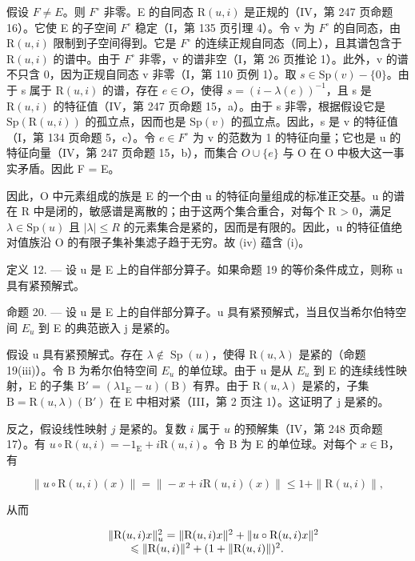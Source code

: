 假设 \(F \neq E\)。则 \(F^{\circ}\) 非零。E 的自同态 \(\mathrm{R}(u,i)\) 是正规的（IV，第 247 页命题 16）。它使 E 的子空间 \(F^{\circ}\) 稳定（I，第 135 页引理 4）。令 v 为 \(F^{\circ}\) 的自同态，由 \(\mathrm{R}(u,i)\) 限制到子空间得到。它是 \(F^{\circ}\) 的连续正规自同态（同上），且其谱包含于 \(\mathrm{R}(u,i)\) 的谱中。由于 \(F^{\circ}\) 非零，v 的谱非空（I，第 26 页推论 1）。此外，v 的谱不只含 0，因为正规自同态 v 非零（I，第 110 页例 1）。取 \(s \in \mathrm{Sp}(v) - \{0\}\)。由于 s 属于 \(\mathrm{R}(u,i)\) 的谱，存在 \(e \in O\)，使得 \(s = (i - \lambda(e))^{-1}\)，且 s 是 \(\mathrm{R}(u,i)\) 的特征值（IV，第 247 页命题 15，a）。由于 s 非零，根据假设它是 \(\mathrm{Sp}(\mathrm{R}(u,i))\) 的孤立点，因而也是 \(\mathrm{Sp}(v)\) 的孤立点。因此，s 是 v 的特征值（I，第 134 页命题 5，c）。令 \(e \in F^{\circ}\) 为 v 的范数为 1 的特征向量；它也是 u 的特征向量（IV，第 247 页命题 15，b），而集合 \(O \cup \{e\}\) 与 O 在 O 中极大这一事实矛盾。因此 F = E。

因此，O 中元素组成的族是 E 的一个由 u 的特征向量组成的标准正交基。u 的谱在 R 中是闭的，敏感谱是离散的；由于这两个集合重合，对每个 R > 0，满足 \(\lambda \in \mathrm{Sp}(u)\) 且 \(|\lambda| \leqslant R\) 的元素集合是紧的，因而是有限的。因此，u 的特征值绝对值族沿 O 的有限子集补集滤子趋于无穷。故 (iv) 蕴含 (i)。

定义 12. --- 设 u 是 E 上的自伴部分算子。如果命题 19 的等价条件成立，则称 u 具有紧预解式。

命题 20. --- 设 u 是 E 上的自伴部分算子。u 具有紧预解式，当且仅当希尔伯特空间 \(E_{u}\) 到 E 的典范嵌入 j 是紧的。

假设 u 具有紧预解式。存在 \(\lambda \notin \operatorname{Sp}(u)\)，使得 \(\mathrm{R}(u, \lambda)\) 是紧的（命题 19(iii)）。令 B 为希尔伯特空间 \(E_{u}\) 的单位球。由于 u 是从 \(E_{u}\) 到 E 的连续线性映射，E 的子集 \(\mathrm{B}' = (\lambda 1_{\mathrm{E}} - u)(\mathrm{B})\) 有界。由于 \(\mathrm{R}(u, \lambda)\) 是紧的，子集 \(\mathrm{B} = \mathrm{R}(u, \lambda)(\mathrm{B}')\) 在 E 中相对紧（III，第 2 页注 1）。这证明了 j 是紧的。

 反之，假设线性映射 \(j\) 是紧的。复数 \(i\) 属于 \(u\) 的预解集（IV，第 248 页命题 17）。有 \(u \circ \mathrm{R}(u, i) = -1_{\mathrm{E}} + i\mathrm{R}(u, i)\)。令 B 为 E 的单位球。对每个 \(x \in \mathrm{B}\)，有

\[
\| u \circ \mathrm{R} (u, i) (x) \| = \| - x + i \mathrm{R} (u, i) (x) \| \leqslant 1 + \| \mathrm{R} (u, i) \|,
\]

从而

\[
\begin{array}{r l} & {\| \mathrm{R} (u, i) x \| _ {u} ^ {2} = \| \mathrm{R} (u, i) x \| ^ {2} + \| u \circ \mathrm{R} (u, i) x \| ^ {2}} \\ & {\qquad \leqslant \| \mathrm{R} (u, i) \| ^ {2} + (1 + \| \mathrm{R} (u, i) \|) ^ {2}.} \end{array}
\]

